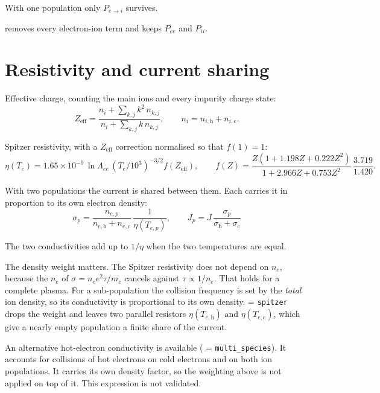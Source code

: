 \documentclass[11pt,a4paper]{article}
\newcommand{\h}{\mathrm{h}}
\newcommand{\co}{\mathrm{c}}
\begin{document}
With one population only $P_{e \to i}$ survives.

 removes every electron-ion term and keeps
$P_{ee}$ and $P_{ii}$.

\section{Resistivity and current sharing}

Effective charge, counting the main ions and every impurity charge state:
\begin{equation}
  Z_{\mathrm{eff}} = \frac{n_i + \sum_{k,j} k^2\, n_{k,j}}{n_i + \sum_{k,j} k\, n_{k,j}} ,
  \qquad n_i = n_{i,\h} + n_{i,\co} .
\end{equation}

Spitzer resistivity, with a $Z_{\mathrm{eff}}$ correction normalised so that $f(1) = 1$:
\begin{equation}
  \eta(T_e) = 1.65\times 10^{-9}\, \ln\Lambda_{ee}\, \left(T_e / 10^{3}\right)^{-3/2}
              f\!\left(Z_{\mathrm{eff}}\right) ,
  \qquad
  f(Z) = \frac{Z\left(1 + 1.198 Z + 0.222 Z^2\right)}{1 + 2.966 Z + 0.753 Z^2}\,
         \frac{3.719}{1.420} .
\end{equation}

With two populations the current is shared between them. Each carries it in proportion to its
own electron density:
\begin{equation}
\boxed{\;
  \sigma_p = \frac{n_{e,p}}{n_{e,\h} + n_{e,\co}}\, \frac{1}{\eta(T_{e,p})} ,
  \qquad
  J_p = J\, \frac{\sigma_p}{\sigma_\h + \sigma_\co} \;}
\end{equation}

The two conductivities add up to $1/\eta$ when the two temperatures are equal.

The density weight matters. The Spitzer resistivity does not depend on $n_e$, because the $n_e$
of $\sigma = n_e e^2 \tau / m_e$ cancels against $\tau \propto 1/n_e$. That holds for a complete
plasma. For a sub-population the collision frequency is set by the \emph{total} ion density, so
its conductivity is proportional to its own density.  = \texttt{spitzer}
drops the weight and leaves two parallel resistors $\eta(T_{e,\h})$ and $\eta(T_{e,\co})$,
which give a nearly empty population a finite share of the current.

An alternative hot-electron conductivity is available
( = \texttt{multi\_species}). It accounts for collisions of hot electrons on
cold electrons and on both ion populations. It carries its own density factor, so the weighting
above is not applied on top of it. This expression is not validated.
\end{document}
